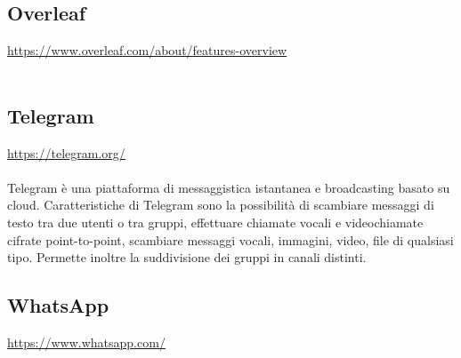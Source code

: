 \documentclass[a4paper,12pt]{article}
\begin{document}
\subsection{Overleaf} \label{strumenti:overleaf}
\underline{\url{https://www.overleaf.com/about/features-overview}} \\\\

\subsection{Telegram} \label{strumenti:telegram}
\underline{\url{https://telegram.org/}} \\\\
Telegram è una piattaforma di messaggistica istantanea e broadcasting basato su cloud. Caratteristiche di Telegram sono la possibilità di scambiare messaggi di testo tra due utenti o tra gruppi, effettuare chiamate vocali e videochiamate cifrate point-to-point, scambiare messaggi vocali, immagini, video, file di qualsiasi tipo. Permette inoltre la suddivisione dei gruppi in canali distinti.

\subsection{WhatsApp} \label{strumenti:whatsapp}
\underline{\url{https://www.whatsapp.com/}} \\\\
\end{document}
